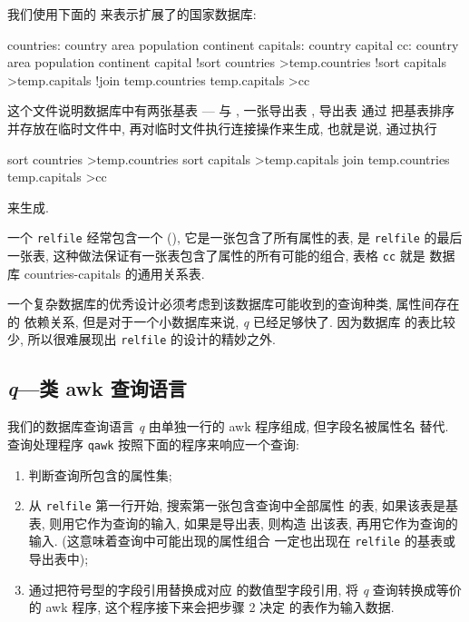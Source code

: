 我们使用下面的  来表示扩展了的国家数据库:
\begin{file}
    countries:
        country
        area
        population
        continent
    capitals:
        country
        capital
    cc:
        country
        area
        population
        continent
        capital
        !sort countries >temp.countries
        !sort capitals >temp.capitals
        !join temp.countries temp.capitals >cc
\end{file}
这个文件说明数据库中有两张基表 ---  与
, 一张导出表 , 导出表  通过 
把基表排序并存放在临时文件中, 再对临时文件执行连接操作来生成, 也就是说, 
 通过执行
\begin{shell}
    sort countries >temp.countries
    sort capitals >temp.capitals
    join temp.countries temp.capitals >cc
\end{shell}
来生成.

一个 \texttt{relfile} 经常包含一个  (), 它是一张包含了所有属性的表, 是 \texttt{relfile} 的最后一张表,
这种做法保证有一张表包含了属性的所有可能的组合, 表格 \texttt{cc} 就是 
数据库 countries-capitals 的通用关系表.

一个复杂数据库的优秀设计必须考虑到该数据库可能收到的查询种类, 属性间存在的
依赖关系, 但是对于一个小数据库来说, \textit{q} 已经足够快了. 因为数据库
的表比较少, 所以很难展现出 \texttt{relfile} 的设计的精妙之外.

\subsection{\textit{q}---类 awk 查询语言}
\label{subsec:q_an_awk_like_query_language}

我们的数据库查询语言 \textit{q} 由单独一行的 awk 程序组成, 但字段名被属性名
替代. 查询处理程序 \texttt{qawk} 按照下面的程序来响应一个查询:
\begin{enumerate}
	\item 判断查询所包含的属性集;
	\item 从 \texttt{relfile} 第一行开始, 搜索第一张包含查询中全部属性
	的表, 如果该表是基表, 则用它作为查询的输入, 如果是导出表, 则构造
	出该表, 再用它作为查询的输入. (这意味着查询中可能出现的属性组合
	一定也出现在 \texttt{relfile} 的基表或导出表中);
	\item 通过把符号型的字段引用替换成对应 的数值型字段引用, 将
	\textit{q} 查询转换成等价的 awk 程序, 这个程序接下来会把步骤 2 决定
	的表作为输入数据.
\end{enumerate}

